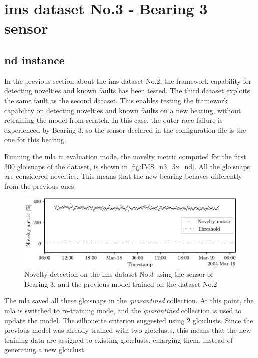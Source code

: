 \section{\gls{ims} dataset No.3 - Bearing 3 sensor}
\label{sec:IMS_n3_3x}

\subsection{\gls{nd} instance}

In the previous section about the \gls{ims} dataset No.2, the framework capability for detecting novelties and known faults has been tested. The third dataset exploits the same fault as the second dataset. This enables testing the framework capability on detecting novelties and known faults on a new bearing, without retraining the model from scratch. In this case, the outer race failure is experienced by Bearing 3, so the sensor declared in the configuration file is the one for this bearing.

Running the \gls{mla} in evaluation mode, the novelty metric computed for the first 300 \gls{glo:snap}s of the dataset, is shown in \autoref{fig:IMS_n3_3x_nd}. All the \gls{glo:snap}s are considered novelties. This means that the new bearing behaves differently from the previous ones. 

\begin{figure}
    \centering
    \includegraphics{images/IMS/Test03/retrain.pdf}
    \caption{Novelty detection on the \gls{ims} dataset No.3 using the sensor of Bearing 3, and the previous model trained on the dataset No.2}
    \label{fig:IMS_n3_3x_nd}
\end{figure}

The \gls{mla} saved all these \gls{glo:snap}s in the \emph{quarantined} collection. At this point, the \gls{mla} is switched to re-training mode, and the \emph{quarantined} collection is used to update the model. The silhouette criterion suggested using 2 \gls{glo:clust}s. Since the previous model was already trained with two \gls{glo:clust}s, this means that the new training data are assigned to existing \gls{glo:clust}s, enlarging them, instead of generating a new \gls{glo:clust}. 

